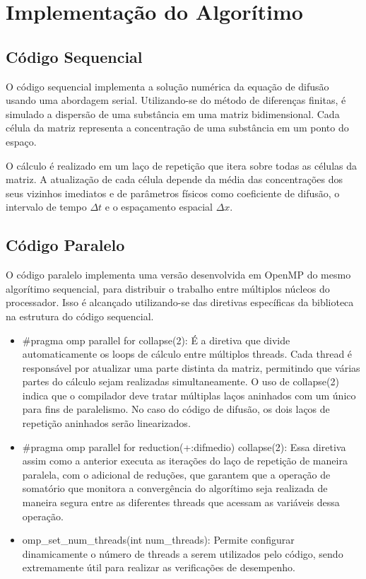 \documentclass[12pt]{article}
\begin{document}
\section{Implementação do Algorítimo}

\subsection{Código Sequencial}

O código sequencial implementa a solução numérica da equação de difusão usando
uma abordagem serial. Utilizando-se do método de diferenças finitas, é simulado
a dispersão de uma substância em uma matriz bidimensional. Cada célula da
matriz representa a concentração de uma substância em um ponto do espaço.

O cálculo é realizado em um laço de repetição que itera sobre todas as células
da matriz. A atualização de cada célula depende da média das concentrações dos
seus vizinhos imediatos e de parâmetros físicos como coeficiente de difusão, o
intervalo de tempo $\Delta t$ e o espaçamento espacial $\Delta x$.

\subsection{Código Paralelo}

O código paralelo implementa uma versão desenvolvida em OpenMP do mesmo
algorítimo sequencial, para distribuir o trabalho entre múltiplos núcleos do
processador. Isso é alcançado utilizando-se das diretivas específicas da
biblioteca na estrutura do código sequencial.

\begin{itemize}
  \item \#pragma omp parallel for collapse(2): É a diretiva que divide
        automaticamente os loops de cálculo entre múltiplos threads. Cada
        thread é
        responsável por atualizar uma parte distinta da matriz, permitindo que
        várias
        partes do cálculo sejam realizadas simultaneamente. O uso de
        collapse(2) indica
        que o compilador deve tratar múltiplas laços aninhados com um único
        para fins
        de paralelismo. No caso do código de difusão, os dois laços de
        repetição
        aninhados serão linearizados.
  \item \#pragma omp parallel for reduction(+:difmedio) collapse(2): Essa
        diretiva assim como a anterior executa as iterações do laço de
        repetição de
        maneira paralela, com o adicional de reduções, que garantem que a
        operação de
        somatório que monitora a convergência do algorítimo seja realizada de
        maneira
        segura entre as diferentes threads que acessam as variáveis dessa
        operação.
  \item omp\_set\_num\_threads(int num\_threads): Permite configurar
        dinamicamente o número de threads a serem utilizados pelo código, sendo
        extremamente útil para realizar as verificações de desempenho.
\end{itemize}
\end{document}

